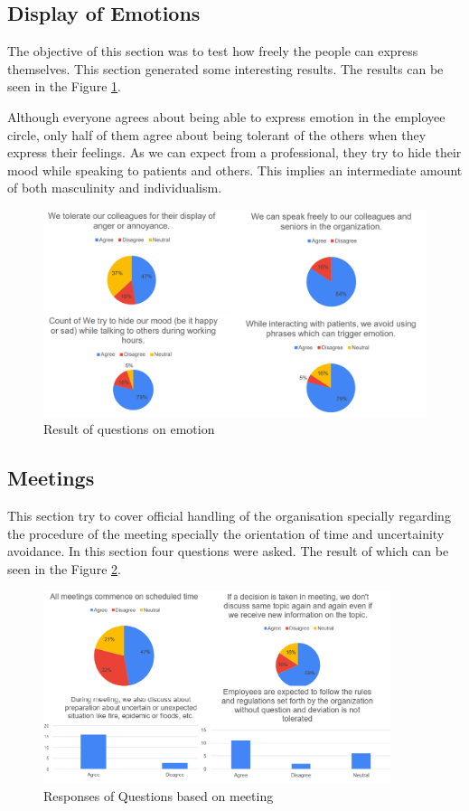 \documentclass[12pt]{article}
\begin{document}
\subsection{Display of Emotions}

The objective of this section was to test how freely the people can express themselves. This section generated some interesting results. The results can be seen in the Figure \ref{Emotion}.

Although everyone agrees about being able to express emotion in the employee circle, only half of them agree about being tolerant of the others when they express their feelings. As we can expect from a professional, they try to hide their mood while speaking to patients and others. This implies an intermediate amount of both masculinity and individualism.

\begin{figure}
    \centering
    \includegraphics[width = 4.5 in]{Emotion.png}
    \caption{Result of questions on emotion}
    \label{Emotion}
\end{figure}

\subsection{Meetings}

This section try to cover official handling of the organisation specially regarding the procedure of the meeting specially the orientation of time and uncertainity avoidance. In this section four questions were asked. The result of which can be seen in the Figure \ref{meeting}.

\begin{figure}
    \begin{center}
        \includegraphics[width = 4in]{Meeting.png}
    \end{center}
    \caption{Responses of Questions based on meeting}
    \label{meeting}
\end{figure}
\end{document}
